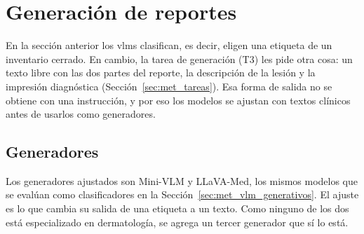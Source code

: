\section{Generación de reportes}
\label{sec:met_generacion}


En la sección anterior los \glspl{vlm} clasifican, es decir, eligen una etiqueta de un inventario cerrado. En cambio, la
tarea de generación (T3) les pide otra cosa: un texto libre con las dos partes del reporte, la descripción de la lesión y la
impresión diagnóstica (Sección~\ref{sec:met_tareas}). Esa forma de salida no se obtiene con una instrucción, y por eso
los modelos se ajustan con textos clínicos antes de usarlos como generadores.

\subsection{Generadores}

Los generadores ajustados son Mini-VLM y LLaVA-Med, los mismos modelos que se evalúan como clasificadores en la
Sección~\ref{sec:met_vlm_generativos}. El ajuste es lo que cambia su salida de una etiqueta a un texto. Como ninguno de
los dos está especializado en dermatología, se agrega un tercer generador que sí lo está.

